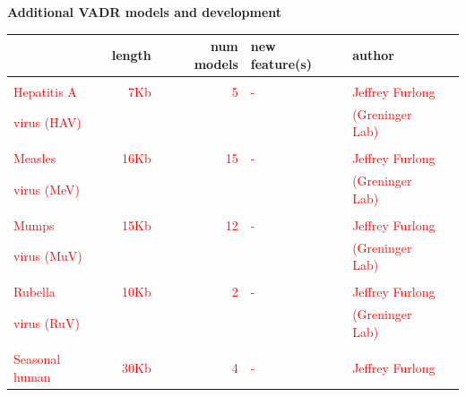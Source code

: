 \documentclass[landscape]{slides}
\begin{document}
\begin{slide}
\begin{center}
  \textbf{Additional VADR models and development}

\small
\begin{tabular}{l|r|r|l|l|l}
 & length & num models & new feature(s) & author\\ \hline
 & & & & & \\ 
\textcolor{red}{Hepatitis A} & \textcolor{red}{7Kb} & \textcolor{red}{5} & \textcolor{red}{-} & \textcolor{red}{Jeffrey Furlong} \\
\textcolor{red}{virus (HAV)} &  &  & & \textcolor{red}{(Greninger Lab)} \\
 & & & & & \\ 
\textcolor{red}{Measles} & \textcolor{red}{16Kb} & \textcolor{red}{15} & \textcolor{red}{-} & \textcolor{red}{Jeffrey Furlong} \\
\textcolor{red}{virus (MeV)} &  &  & & \textcolor{red}{(Greninger Lab)} \\
 & & & & & \\ 
\textcolor{red}{Mumps} & \textcolor{red}{15Kb} & \textcolor{red}{12} & \textcolor{red}{-} & \textcolor{red}{Jeffrey Furlong} \\
\textcolor{red}{virus (MuV)} &  &  & & \textcolor{red}{(Greninger Lab)} \\
 & & & & & \\ 
\textcolor{red}{Rubella} & \textcolor{red}{10Kb} & \textcolor{red}{2} & \textcolor{red}{-} & \textcolor{red}{Jeffrey Furlong} \\
\textcolor{red}{virus (RuV)} &  &  & & \textcolor{red}{(Greninger Lab)} \\
 & & & & & \\ 
\textcolor{red}{Seasonal human} & \textcolor{red}{30Kb} & \textcolor{red}{4} & \textcolor{red}{-} & \textcolor{red}{Jeffrey Furlong} \\

\end{tabular}
\end{center}
\end{slide}
\end{document}
